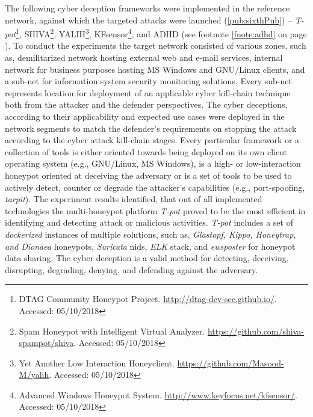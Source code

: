 The following cyber deception frameworks were implemented in the reference network, against which the targeted attacks were launched (\ref{pub:sixthPub}) -- \textit{T-pot}\footnote{DTAG Community Honeypot Project. \url{http://dtag-dev-sec.github.io/}. Accessed: 05/10/2018}, SHIVA\footnote{Spam Honeypot with Intelligent Virtual Analyzer. \url{https://github.com/shiva-spampot/shiva}. Accessed: 05/10/2018}, YALIH\footnote{Yet Another Low Interaction Honeyclient. \url{https://github.com/Masood-M/yalih}. Accessed: 05/10/2018}, KFsensor\footnote{Advanced Windows Honeypot System. \url{http://www.keyfocus.net/kfsensor/}. Accessed: 05/10/2018}, and ADHD (see footnote \ref{fnote:adhd} on page \pageref{fnote:adhd}).
To conduct the experiments the target network consisted of various zones, such as, demilitarized network hosting external web and e-mail services, internal network for business purposes hosting MS Windows and GNU/Linux clients, and a sub-net for information system security monitoring solutions. Every sub-net represents location for deployment of an applicable cyber kill-chain technique both from the attacker and the defender perspectives. The cyber deceptions, according to their applicability and expected use cases were deployed in the network segments to match the defender's requirements on stopping the attack according to the cyber attack kill-chain stages.
Every particular framework or a collection of tools is either oriented towards being deployed on its own client operating system (e.g., GNU/Linux, MS Windows), is a high- or low-interaction honeypot oriented at deceiving the adversary or is a set of tools to be used to actively detect, counter or degrade the attacker's capabilities (e.g., port-spoofing, \textit{tarpit}). The experiment results identified, that out of all implemented technologies the multi-honeypot platform \textit{T-pot} proved to be the most efficient in identifying and detecting attack or malicious activities. \textit{T-pot} includes a set of \textit{dockerized} instances of multiple solutions, such as, \textit{Glastopf, Kippo, Honeytrap, and Dionaea} honeypots, \textit{Suricata} \gls{nids}, \textit{ELK} stack, and \textit{ewsposter} for honeypot data sharing.
The cyber deception is a valid method for detecting, deceiving, disrupting, degrading, denying, and defending against the adversary.

